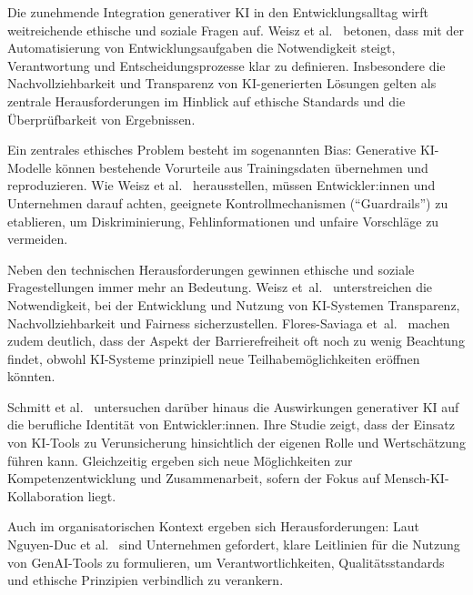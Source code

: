Die zunehmende Integration generativer KI in den Entwicklungsalltag wirft
weitreichende ethische und soziale Fragen auf. Weisz et
al.~\cite{weisz_design_2024} betonen, dass mit der Automatisierung von
Entwicklungsaufgaben die Notwendigkeit steigt, Verantwortung und
Entscheidungsprozesse klar zu definieren. Insbesondere die Nachvollziehbarkeit
und Transparenz von KI-generierten Lösungen gelten als zentrale
Herausforderungen im Hinblick auf ethische Standards und die Überprüfbarkeit
von Ergebnissen.

Ein zentrales ethisches Problem besteht im sogenannten Bias: Generative
KI-Modelle können bestehende Vorurteile aus Trainingsdaten übernehmen und
reproduzieren. Wie Weisz et al.~\cite{weisz_design_2024} herausstellen, müssen
Entwickler:innen und Unternehmen darauf achten, geeignete Kontrollmechanismen
(\enquote{Guardrails}) zu etablieren, um Diskriminierung, Fehlinformationen und
unfaire Vorschläge zu vermeiden.

Neben den technischen Herausforderungen gewinnen ethische und soziale
Fragestellungen immer mehr an Bedeutung. Weisz et~al.~\cite{weisz_design_2024}
unterstreichen die Notwendigkeit, bei der Entwicklung und Nutzung von
KI-Systemen Transparenz, Nachvollziehbarkeit und Fairness sicherzustellen.
Flores-Saviaga et~al.~\cite{flores-saviaga_impact_2025} machen zudem deutlich,
dass der Aspekt der Barrierefreiheit oft noch zu wenig Beachtung findet, obwohl
KI-Systeme prinzipiell neue Teilhabemöglichkeiten eröffnen könnten.

Schmitt et al.~\cite{schmitt_generative_2024} untersuchen darüber hinaus die
Auswirkungen generativer KI auf die berufliche Identität von Entwickler:innen.
Ihre Studie zeigt, dass der Einsatz von KI-Tools zu Verunsicherung hinsichtlich
der eigenen Rolle und Wertschätzung führen kann. Gleichzeitig ergeben sich neue
Möglichkeiten zur Kompetenzentwicklung und Zusammenarbeit, sofern der Fokus auf
Mensch-KI-Kollaboration liegt.

Auch im organisatorischen Kontext ergeben sich Herausforderungen: Laut
Nguyen-Duc et al.~\cite{nguyen-duc_generative_2023} sind Unternehmen gefordert,
klare Leitlinien für die Nutzung von GenAI-Tools zu formulieren, um
Verantwortlichkeiten, Qualitätsstandards und ethische Prinzipien verbindlich zu
verankern.
